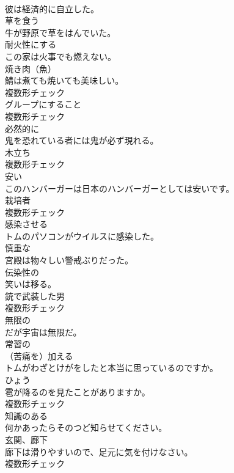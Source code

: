 \documentclass[8pt]{extreport}
\begin{document}
\begin{CJK}{UTF8}{min}
\\	彼は経済的に自立した。	
\\	[動詞]	草を食う	
\\	牛が野原で草をはんでいた。	
\\	[動詞]	耐火性にする	
\\	この家は火事でも燃えない。	
\\	[名詞]	焼き肉（魚）	
\\	鯖は煮ても焼いても美味しい。	
\\	複数形チェック
\\	[名詞]	グループにすること	
\\	複数形チェック
\\	[副詞]	必然的に	
\\	鬼を恐れている者には鬼が必ず現れる。	
\\	[名詞]	木立ち	
\\	複数形チェック
\\	[形容詞]	安い	
\\	このハンバーガーは日本のハンバーガーとしては安いです。	
\\	[名詞]	栽培者	
\\	複数形チェック
\\	[動詞]	感染させる	
\\	トムのパソコンがウイルスに感染した。	
\\	[形容詞]	慎重な	
\\	宮殿は物々しい警戒ぶりだった。	
\\	[形容詞]	伝染性の	
\\	笑いは移る。	
\\	[名詞]	銃で武装した男	
\\	複数形チェック
\\	[形容詞]	無限の	
\\	だが宇宙は無限だ。	
\\	[形容詞]	常習の	
\\	[動詞]	（苦痛を）加える	
\\	トムがわざとけがをしたと本当に思っているのですか。	
\\	[名詞]	ひょう	
\\	雹が降るのを見たことがありますか。	
\\	複数形チェック
\\	[形容詞]	知識のある	
\\	何かあったらそのつど知らせてください。	
\\	[名詞]	玄関、廊下	
\\	廊下は滑りやすいので、足元に気を付けなさい。	
\\	複数形チェック

\end{CJK}
\end{document}
